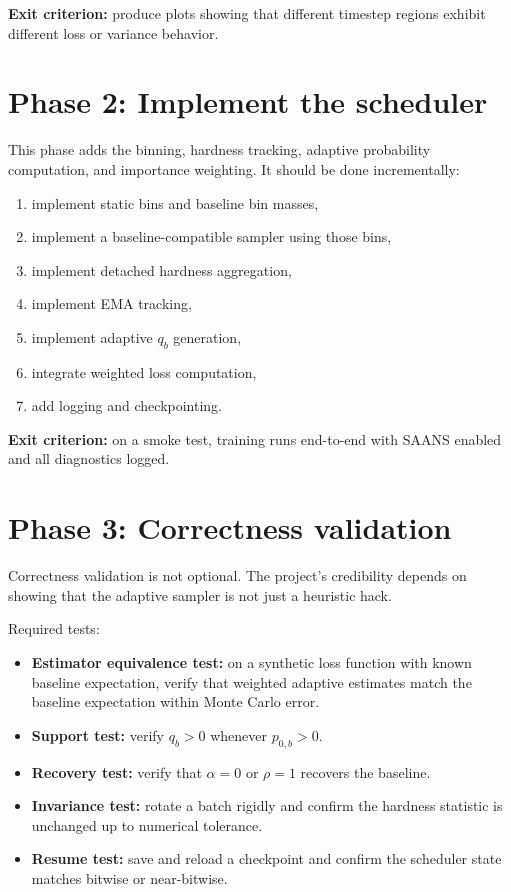 \documentclass[11pt]{report}
\begin{document}
\textbf{Exit criterion:} produce plots showing that different timestep regions exhibit different loss or variance behavior.

\section{Phase 2: Implement the scheduler}

This phase adds the binning, hardness tracking, adaptive probability computation, and importance weighting. It should be done incrementally:

\begin{enumerate}[leftmargin=2em]
    \item implement static bins and baseline bin masses,
    \item implement a baseline-compatible sampler using those bins,
    \item implement detached hardness aggregation,
    \item implement EMA tracking,
    \item implement adaptive $q_b$ generation,
    \item integrate weighted loss computation,
    \item add logging and checkpointing.
\end{enumerate}

\textbf{Exit criterion:} on a smoke test, training runs end-to-end with SAANS enabled and all diagnostics logged.

\section{Phase 3: Correctness validation}

Correctness validation is not optional. The project's credibility depends on showing that the adaptive sampler is not just a heuristic hack.

Required tests:

\begin{itemize}[leftmargin=2em]
    \item \textbf{Estimator equivalence test:} on a synthetic loss function with known baseline expectation, verify that weighted adaptive estimates match the baseline expectation within Monte Carlo error.
    \item \textbf{Support test:} verify $q_b > 0$ whenever $p_{0,b} > 0$.
    \item \textbf{Recovery test:} verify that $\alpha=0$ or $\rho=1$ recovers the baseline.
    \item \textbf{Invariance test:} rotate a batch rigidly and confirm the hardness statistic is unchanged up to numerical tolerance.
    \item \textbf{Resume test:} save and reload a checkpoint and confirm the scheduler state matches bitwise or near-bitwise.
\end{itemize}
\end{document}
